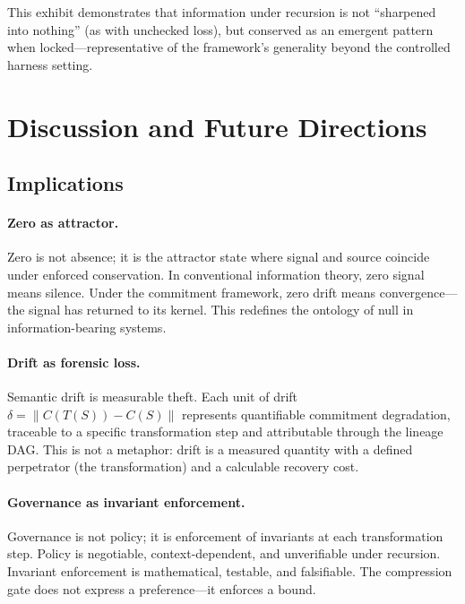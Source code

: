 \documentclass[11pt,a4paper]{article}
\begin{document}
This exhibit demonstrates that information under recursion is not ``sharpened into nothing'' (as with unchecked loss), but conserved as an emergent pattern when locked---representative of the framework's generality beyond the controlled harness setting.

\section{Discussion and Future Directions}
\label{sec:discussion}

\subsection{Implications}

\paragraph{Zero as attractor.}
Zero is not absence; it is the attractor state where signal and source coincide under enforced conservation. In conventional information theory, zero signal means silence. Under the commitment framework, zero drift means convergence---the signal has returned to its kernel. This redefines the ontology of null in information-bearing systems.

\paragraph{Drift as forensic loss.}
Semantic drift is measurable theft. Each unit of drift $\delta = \| C(T(S)) - C(S) \|$ represents quantifiable commitment degradation, traceable to a specific transformation step and attributable through the lineage DAG. This is not a metaphor: drift is a measured quantity with a defined perpetrator (the transformation) and a calculable recovery cost.

\paragraph{Governance as invariant enforcement.}
Governance is not policy; it is enforcement of invariants at each transformation step. Policy is negotiable, context-dependent, and unverifiable under recursion. Invariant enforcement is mathematical, testable, and falsifiable. The compression gate does not express a preference---it enforces a bound.
\end{document}
